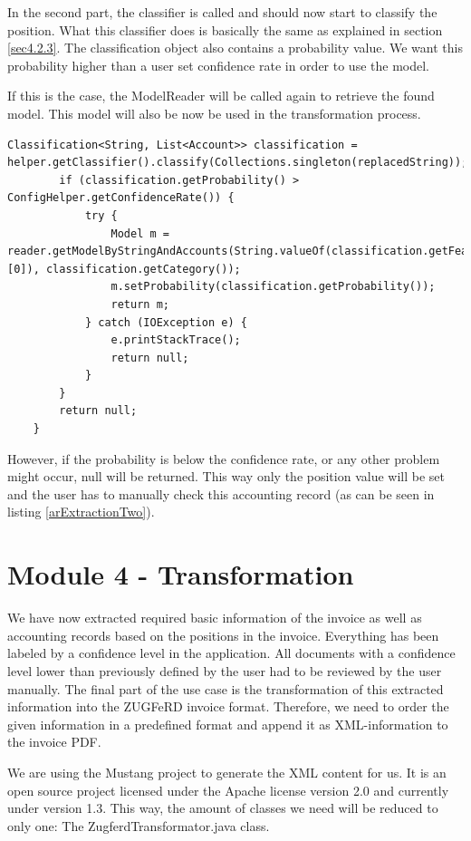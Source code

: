 In the second part, the classifier is called and should now start to classify the position. What this classifier does is basically the same as explained in section \ref{sec4.2.3}. The classification object also contains a probability value. We want this probability higher than a user set confidence rate in order to use the model.

If  this is the case, the ModelReader will be called again to retrieve the found model. This model will also be now be used in the transformation process. 

\begin{lstlisting}[caption={Classification of a position}]
        Classification<String, List<Account>> classification = helper.getClassifier().classify(Collections.singleton(replacedString));
        if (classification.getProbability() > ConfigHelper.getConfidenceRate()) {
            try {
                Model m = reader.getModelByStringAndAccounts(String.valueOf(classification.getFeatureset().toArray()[0]), classification.getCategory());
                m.setProbability(classification.getProbability());
                return m;
            } catch (IOException e) {
                e.printStackTrace();
                return null;
            }
        }
        return null;
    }
\end{lstlisting}

However, if the probability is below the confidence rate, or any other problem might occur, null will be returned. This way only the position value will be set and the user has to manually check this accounting record (as can be seen in listing \ref{arExtractionTwo}).
    
\section{Module 4 - Transformation}
\label{sec5.7}

We have now extracted required basic information of the invoice as well as accounting records based on the positions in the invoice. Everything has been labeled by a confidence level in the application. All documents with a confidence level lower than previously defined by the user had to be reviewed by the user manually.
The final part of the use case is the transformation of this extracted information into the ZUGFeRD invoice format. Therefore, we need to order the given information in a predefined format and append it as XML-information to the invoice PDF.

We are using the Mustang project to generate the XML content for us. It is an open source project licensed under the Apache license version 2.0 and currently under version 1.3. This way, the amount of classes we need will be reduced to only one: The ZugferdTransformator.java class.

